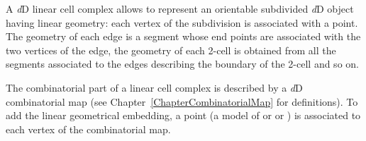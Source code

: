 A \emph{d}D linear cell complex allows to represent an orientable
subdivided \emph{d}D object having linear geometry: each vertex of the
subdivision is associated with a point. The geometry of each edge is a
segment whose end points are associated with the two vertices of the
edge, the geometry of each 2-cell is obtained from all the segments
associated to the edges describing the boundary of the 2-cell and so
on.

The combinatorial part of a linear cell complex is described by a
\emph{d}D combinatorial map (see Chapter~\ref{ChapterCombinatorialMap}
for definitions).  To add the linear geometrical embedding, a point (a
model of  or  or
) is associated to each vertex of the combinatorial
map.

